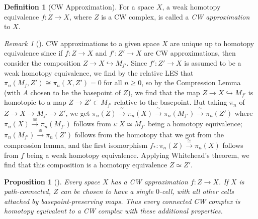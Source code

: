 \documentclass[reqno]{amsart}
\newtheorem{proposition}[theorem]{Proposition}
\theoremstyle{definition}
\newtheorem{definition}[theorem]{Definition}
\theoremstyle{remark}
\newtheorem*{remark}{Remark}
\begin{document}
\begin{definition}[CW Approximation]
    For a space $X$, a weak homotopy equivalence
    $f \colon Z \to X$, where $Z$ is a CW complex, is
    called a \textit{CW approximation} to $X$.
\end{definition}

\begin{remark}[]
    CW approximations to a given space $X$ are
    unique up to homotopy equivalence since
    if $f \colon Z \to X$ and 
    $f' \colon Z' \to X$ are CW approximations, then
    consider the composition
    $Z \to X \hookrightarrow M_{f'}$.
    Since $f' \colon Z' \to X$ is assumed to be a weak
    homotopy equivalence, we find by the relative LES that
    $\pi_n (M_f, Z') \cong \pi_n \left( X, Z' \right) = 0$ for all
    $n\ge 0$, so by 
    the Compression Lemma (with $A$ chosen to
    be the basepoint of $Z$), we
    find that the map $Z \to X \hookrightarrow M_{f'}$
    is homotopic to a map
    $Z \to Z' \subset M_{f'}$ relative
    to the basepoint.
    But taking $\pi_n$ of
    $Z \to X \to M_{f'} \to Z'$, we get
    $\pi_n(Z) \stackrel{\cong}{\to} 
    \pi_n(X) \stackrel{\cong}{\to} 
    \pi_n (M_{f'}) \stackrel{\cong}{\to}
    \pi_n \left( Z' \right)$
    where $\pi_n (X) \stackrel{\cong}{\to} \pi_n (M_{f'})$ 
    follows from $\iota \colon X \simeq M_{f'}$ being
    a homotopy equivalence;
    $\pi_n\left( M_{f'} \right) 
    \stackrel{\cong}{\to} \pi_n (Z')$ follows
    from the homotopy that we got from the compression lemma,
    and the first isomorphism
    $f_* \colon \pi_n (Z) \stackrel{\cong}{\to}  \pi_n (X)$ 
    follows from $f$ being a weak homotopy equivalence.
    Applying Whitehead's theorem, we find that this
    composition is a homotopy equivalence
    $Z \simeq Z'$.
\end{remark}

\begin{proposition}[]\label{Prop:CW-Approximation}
    Every space $X$ has a CW approximation
    $f \colon Z \to X$. If $X$ is path-connected,
    $Z$ can be chosen to have a single $0$-cell, with
    all other cells attached by basepoint-preserving maps.
    Thus every connected CW complex is homotopy equivalent to
    a CW complex with these additional properties.
\end{proposition}
\end{document}
